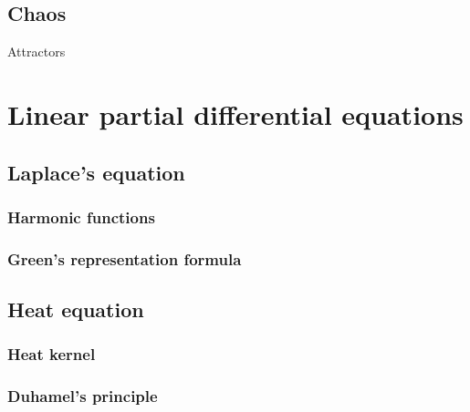 \documentclass{../note}
\begin{document}
\chapter{Chaos}
Attractors







\part{Linear partial differential equations}


\chapter{Laplace's equation}
\section{Harmonic functions}
\begin{prb}
\end{prb}
\begin{prb}
\end{prb}


\begin{prb}
\end{prb}
\begin{prb}
\end{prb}
\begin{prb}
\end{prb}

\section{Green's representation formula}







\chapter{Heat equation}
\section{Heat kernel}

\section{Duhamel's principle}
\end{document}
